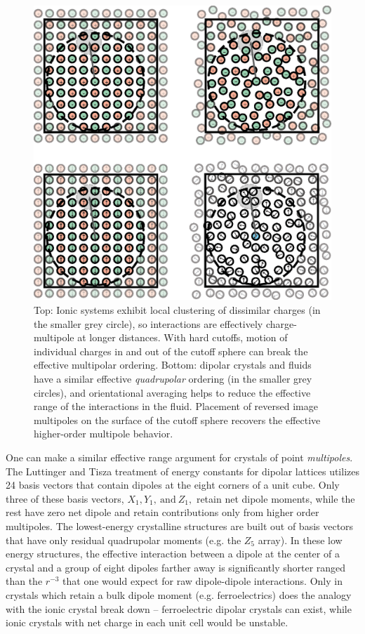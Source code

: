 \begin{figure}
  \centering
  \includegraphics[width=\linewidth]{schematic.eps}
  \caption{Top: Ionic systems exhibit local clustering of dissimilar
    charges (in the smaller grey circle), so interactions are
    effectively charge-multipole at longer distances.  With hard
    cutoffs, motion of individual charges in and out of the cutoff
    sphere can break the effective multipolar ordering.  Bottom:
    dipolar crystals and fluids have a similar effective
    \textit{quadrupolar} ordering (in the smaller grey circles), and
    orientational averaging helps to reduce the effective range of the
    interactions in the fluid.  Placement of reversed image multipoles
    on the surface of the cutoff sphere recovers the effective
    higher-order multipole behavior. \label{fig:schematic}}
\end{figure}

One can make a similar effective range argument for crystals of point
\textit{multipoles}. The Luttinger and Tisza treatment of energy
constants for dipolar lattices utilizes 24 basis vectors that contain
dipoles at the eight corners of a unit cube.\cite{LT} Only three of
these basis vectors, $X_1, Y_1, \mathrm{~and~} Z_1,$ retain net dipole
moments, while the rest have zero net dipole and retain contributions
only from higher order multipoles.  The lowest-energy crystalline
structures are built out of basis vectors that have only residual
quadrupolar moments (e.g. the $Z_5$ array). In these low energy
structures, the effective interaction between a dipole at the center
of a crystal and a group of eight dipoles farther away is
significantly shorter ranged than the $r^{-3}$ that one would expect
for raw dipole-dipole interactions.  Only in crystals which retain a
bulk dipole moment (e.g. ferroelectrics) does the analogy with the
ionic crystal break down -- ferroelectric dipolar crystals can exist,
while ionic crystals with net charge in each unit cell would be
unstable.

